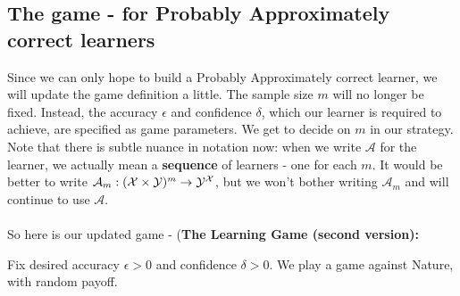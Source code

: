\documentclass[11pt]{article}
\newcommand{\R}{\ensuremath{\mathbb{R}}}
\newcommand{\Ac}{\mathcal{A}}
\newcommand{\Xc}{\mathcal{X}}
\newcommand{\Hc}{\mathcal{H}}
\begin{document}
{%


\subsection{The game - for Probably Approximately correct learners}

Since we can only hope to build a Probably Approximately correct learner, we
will update the game definition a little. The sample size $m$ will no longer be
fixed. Instead, the accuracy $\epsilon$ and confidence $\delta$,  which our
learner is required to achieve, are specified as game parameters. We get to
decide on $m$ in our strategy. Note that there is subtle nuance in notation now:
when we write $\Ac$ for the learner, we actually mean a {\bf sequence} of
learners - one for each $m$. It would be better to write $\Ac_m:(\X\times \Y)^m
\to \Y^\X$, but we won't bother writing $\Ac_m$ and will continue to use $\Ac$.
\\~\\
So here is our updated game - (\bf The Learning Game (second version):} Fix desired accuracy $\epsilon>0$ and confidence $\delta>0$. We play a game against Nature, with random payoff.
\end{document}
